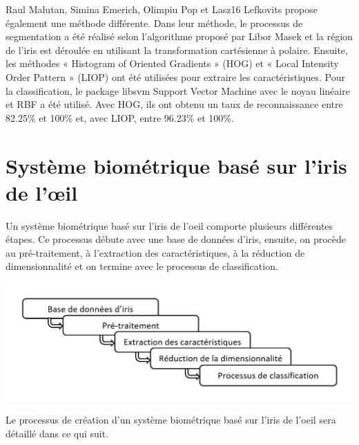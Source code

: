\documentclass[12pt,twoside,letterpaper]{article}
\begin{document}
Raul Malutan, Simina Emerich, Olimpiu Pop et Lasz16 Lefkovits propose également une méthode différente. Dans leur méthode, le processus de segmentation a été réalisé selon l'algorithme proposé par Libor Masek et la région de l'iris est déroulée en utilisant la transformation cartésienne à polaire. Ensuite, les méthodes « Histogram of Oriented Gradients » (HOG) et « Local Intensity Order Pattern » (LIOP) ont été utilisées pour extraire les caractéristiques. Pour la classification, le package libsvm Support Vector Machine avec le noyau linéaire et RBF a été utilisé. Avec HOG, ils ont obtenu un taux de reconnaissance entre 82.25\% et 100\% et, avec LIOP, entre 96.23\% et 100\%.\cite{ref_10}

\section{Système biométrique basé sur l’iris de l’œil}

Un système biométrique basé sur l'iris de l'oeil comporte plusieurs différentes étapes. Ce processus débute avec une base de données d'iris, ensuite, on procède au pré-traitement, à l'extraction des caractéristiques, à la réduction de dimensionnalité et on termine avec le processus de classification. 

\begin{center}
    \includegraphics[width = 14cm]{schema}
\end{center}

Le processus de création d'un système biométrique basé sur l'iris de l'oeil sera détaillé dans ce qui suit.
\end{document}
